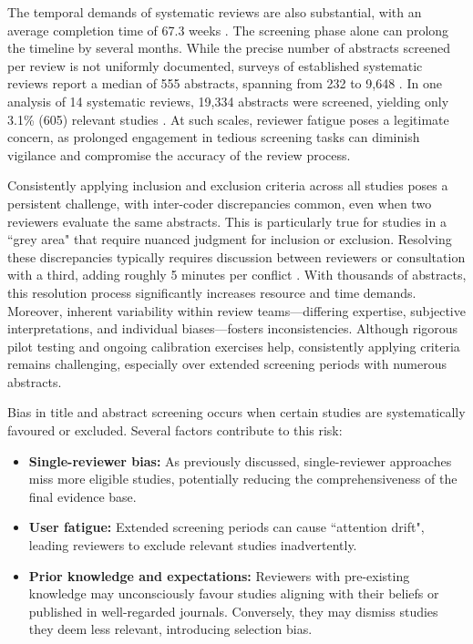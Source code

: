 \documentclass[10pt,oneside]{book}
\begin{document}
The temporal demands of systematic reviews are also substantial, with an average completion time of 67.3 weeks \cite{borah_analysis_2017}. The screening phase alone can prolong the timeline by several months. While the precise number of abstracts screened per review is not uniformly documented, surveys of established systematic reviews report a median of 555 abstracts, spanning from 232 to 9,648 \cite{nama_successful_2021}. In one analysis of 14 systematic reviews, 19,334 abstracts were screened, yielding only 3.1\% (605) relevant studies \cite{nama_successful_2021}. At such scales, reviewer fatigue poses a legitimate concern, as prolonged engagement in tedious screening tasks can diminish vigilance and compromise the accuracy of the review process.


Consistently applying inclusion and exclusion criteria across all studies poses a persistent challenge, with inter-coder discrepancies common, even when two reviewers evaluate the same abstracts. This is particularly true for studies in a ``grey area" that require nuanced judgment for inclusion or exclusion. Resolving these discrepancies typically requires discussion between reviewers or consultation with a third, adding roughly 5 minutes per conflict \cite{shemilt_use_2016}. With thousands of abstracts, this resolution process significantly increases resource and time demands. Moreover, inherent variability within review teams—differing expertise, subjective interpretations, and individual biases—fosters inconsistencies. Although rigorous pilot testing and ongoing calibration exercises help, consistently applying criteria remains challenging, especially over extended screening periods with numerous abstracts.

Bias in title and abstract screening occurs when certain studies are systematically favoured or excluded. Several factors contribute to this risk: 
\begin{itemize} 
\item \textbf{Single-reviewer bias:} As previously discussed, single-reviewer approaches miss more eligible studies, potentially reducing the comprehensiveness of the final evidence base.
\item \textbf{User fatigue:} Extended screening periods can cause ``attention drift", leading reviewers to exclude relevant studies inadvertently.
\item \textbf{Prior knowledge and expectations:} Reviewers with pre-existing knowledge may unconsciously favour studies aligning with their beliefs or published in well-regarded journals. Conversely, they may dismiss studies they deem less relevant, introducing selection bias.
\end{itemize}
\end{document}
